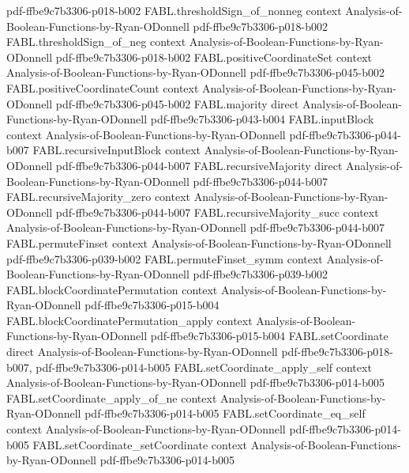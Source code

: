 \begin{theorem}
  {pdf-ffbe9c7b3306-p018-b002}
\proofstep
  {FABL.thresholdSign_of_nonneg}
  {context}
  {Analysis-of-Boolean-Functions-by-Ryan-ODonnell}
  {pdf-ffbe9c7b3306-p018-b002}
\proofstep
  {FABL.thresholdSign_of_neg}
  {context}
  {Analysis-of-Boolean-Functions-by-Ryan-ODonnell}
  {pdf-ffbe9c7b3306-p018-b002}
\proofstep
  {FABL.positiveCoordinateSet}
  {context}
  {Analysis-of-Boolean-Functions-by-Ryan-ODonnell}
  {pdf-ffbe9c7b3306-p045-b002}
\proofstep
  {FABL.positiveCoordinateCount}
  {context}
  {Analysis-of-Boolean-Functions-by-Ryan-ODonnell}
  {pdf-ffbe9c7b3306-p045-b002}
\proofstep
  {FABL.majority}
  {direct}
  {Analysis-of-Boolean-Functions-by-Ryan-ODonnell}
  {pdf-ffbe9c7b3306-p043-b004}
\proofstep
  {FABL.inputBlock}
  {context}
  {Analysis-of-Boolean-Functions-by-Ryan-ODonnell}
  {pdf-ffbe9c7b3306-p044-b007}
\proofstep
  {FABL.recursiveInputBlock}
  {context}
  {Analysis-of-Boolean-Functions-by-Ryan-ODonnell}
  {pdf-ffbe9c7b3306-p044-b007}
\proofstep
  {FABL.recursiveMajority}
  {direct}
  {Analysis-of-Boolean-Functions-by-Ryan-ODonnell}
  {pdf-ffbe9c7b3306-p044-b007}
\proofstep
  {FABL.recursiveMajority_zero}
  {context}
  {Analysis-of-Boolean-Functions-by-Ryan-ODonnell}
  {pdf-ffbe9c7b3306-p044-b007}
\proofstep
  {FABL.recursiveMajority_succ}
  {context}
  {Analysis-of-Boolean-Functions-by-Ryan-ODonnell}
  {pdf-ffbe9c7b3306-p044-b007}
\proofstep
  {FABL.permuteFinset}
  {context}
  {Analysis-of-Boolean-Functions-by-Ryan-ODonnell}
  {pdf-ffbe9c7b3306-p039-b002}
\proofstep
  {FABL.permuteFinset_symm}
  {context}
  {Analysis-of-Boolean-Functions-by-Ryan-ODonnell}
  {pdf-ffbe9c7b3306-p039-b002}
\proofstep
  {FABL.blockCoordinatePermutation}
  {context}
  {Analysis-of-Boolean-Functions-by-Ryan-ODonnell}
  {pdf-ffbe9c7b3306-p015-b004}
\proofstep
  {FABL.blockCoordinatePermutation_apply}
  {context}
  {Analysis-of-Boolean-Functions-by-Ryan-ODonnell}
  {pdf-ffbe9c7b3306-p015-b004}
\proofstep
  {FABL.setCoordinate}
  {direct}
  {Analysis-of-Boolean-Functions-by-Ryan-ODonnell}
  {pdf-ffbe9c7b3306-p018-b007,
    pdf-ffbe9c7b3306-p014-b005}
\proofstep
  {FABL.setCoordinate_apply_self}
  {context}
  {Analysis-of-Boolean-Functions-by-Ryan-ODonnell}
  {pdf-ffbe9c7b3306-p014-b005}
\proofstep
  {FABL.setCoordinate_apply_of_ne}
  {context}
  {Analysis-of-Boolean-Functions-by-Ryan-ODonnell}
  {pdf-ffbe9c7b3306-p014-b005}
\proofstep
  {FABL.setCoordinate_eq_self}
  {context}
  {Analysis-of-Boolean-Functions-by-Ryan-ODonnell}
  {pdf-ffbe9c7b3306-p014-b005}
\proofstep
  {FABL.setCoordinate_setCoordinate}
  {context}
  {Analysis-of-Boolean-Functions-by-Ryan-ODonnell}
  {pdf-ffbe9c7b3306-p014-b005}

\end{theorem}
